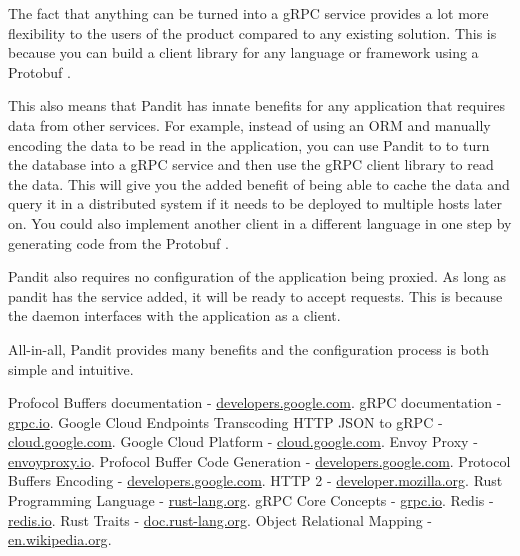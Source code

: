 \documentclass[a4paper,12pt]{report}
\begin{document}
The fact that anything can be turned into a gRPC service provides a lot more flexibility to the users of the product compared to any existing solution.
This is because you can build a client library for any language or framework using a Protobuf \cite{codegen}.

This also means that Pandit has innate benefits for any application that requires data from other services.
For example, instead of using an ORM \cite{orm} and manually encoding the data to be read in the application, you can use Pandit to
to turn the database into a gRPC service and then use the gRPC client library to read the data. This will give you the added benefit of
being able to cache the data and query it in a distributed system if it needs to be deployed to multiple hosts later on.
You could also implement another client in a different language in one step by generating code from the Protobuf \cite{codegen}.

Pandit also requires no configuration of the application being proxied. As long as pandit has the service added, it will be ready to accept requests.
This is because the daemon interfaces with the application as a client.

All-in-all, Pandit provides many benefits and the configuration process is both simple and intuitive.

\begin{thebibliography}{9}
    Profocol Buffers documentation - \href{https://developers.google.com/protocol-buffers}{developers.google.com}.
    gRPC documentation - \href{https://grpc.io/docs/}{grpc.io}.
    Google Cloud Endpoints Transcoding HTTP JSON to gRPC - \href{https://cloud.google.com/endpoints/docs/grpc/transcoding}{cloud.google.com}.
    Google Cloud Platform - \href{https://cloud.google.com/}{cloud.google.com}.
    Envoy Proxy - \href{https://www.envoyproxy.io/docs/envoy/latest/intro/arch_overview/arch_overview}{envoyproxy.io}.
    Profocol Buffer Code Generation - \href{https://developers.google.com/protocol-buffers/docs/reference/go-generated}{developers.google.com}.
    Protocol Buffers Encoding - \href{https://developers.google.com/protocol-buffers/docs/encoding}{developers.google.com}.
    HTTP 2 - \href{https://developer.mozilla.org/en-US/docs/Glossary/HTTP_2}{developer.mozilla.org}.
    Rust Programming Language - \href{https://www.rust-lang.org/}{rust-lang.org}.
    gRPC Core Concepts - \href{https://grpc.io/docs/what-is-grpc/core-concepts/}{grpc.io}.
    Redis - \href{https://redis.io/}{redis.io}.
    Rust Traits - \href{https://doc.rust-lang.org/rust-by-example/trait.html}{doc.rust-lang.org}.
    Object Relational Mapping - \href{https://en.wikipedia.org/wiki/Object%E2%80%93relational_mapping}{en.wikipedia.org}.
\end{thebibliography}
\end{document}
